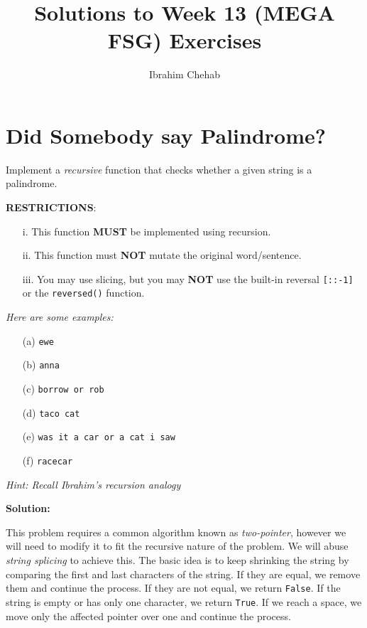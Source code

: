 \documentclass{article}
\title{Solutions to Week 13 (MEGA FSG) Exercises}
\author{Ibrahim Chehab}
\begin{document}
\maketitle

\section{Did Somebody say Palindrome?}

Implement a \textit{recursive} function that checks whether a given string is a palindrome.
  
  \begin{center}
    \textbf{RESTRICTIONS}:
    \begin{itemize}
      \item[i.] This function \textbf{MUST} be implemented using recursion.
      \item[ii.] This function must \textbf{NOT} mutate the original word/sentence.
      \item[iii.] You may use slicing, but you may \textbf{NOT} use the built-in reversal \texttt{[::-1]} or the \texttt{reversed()} function.
    \end{itemize}
  \end{center}

\textit{  Here are some examples:}
  \begin{enumerate}
      \item[(a)] \texttt{ewe}
      \item[(b)] \texttt{anna}
      \item[(c)] \texttt{borrow or rob}
      \item[(d)] \texttt{taco cat}
      \item[(e)] \texttt{was it a car or a cat i saw}
      \item[(f)] \texttt{racecar}
    \end{enumerate}
    \textit{Hint: Recall Ibrahim's recursion analogy}

\textbf{Solution:}

This problem requires a common algorithm known as \textit{two-pointer}, however we will need to modify it to fit the recursive nature of the problem. We will abuse \textit{string splicing} to achieve this. The basic idea is to keep shrinking the string by comparing the first and last characters of the string. If they are equal, we remove them and continue the process. If they are not equal, we return \texttt{False}. If the string is empty or has only one character, we return \texttt{True}. If we reach a space, we move only the affected pointer over one and continue the process.
\end{document}
